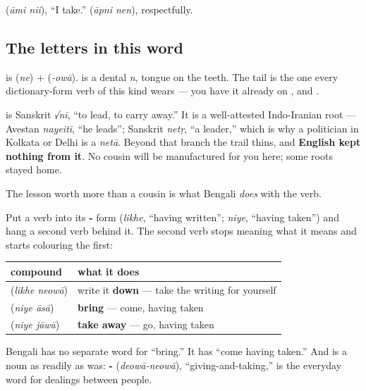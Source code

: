   (\emph{āmi nii}), \textquotedblleft{}I take.\textquotedblright{}   (\emph{āpni nen}), respectfully.

\subsection*{The letters in this word}
\textbf{} is \textbf{} (\emph{ne}) + \textbf{} (\emph{-owā}). \textbf{} is a dental \emph{n}, tongue on the teeth. The \textbf{} tail is the one every dictionary-form verb of this kind wears — you have it already on ,  and .

\begin{cousinweb}
\textbf{} is Sanskrit \emph{√nī}, \textquotedblleft{}to lead, to carry away.\textquotedblright{} It is a well-attested Indo-Iranian root — Avestan \emph{nayeiti}, \textquotedblleft{}he leads\textquotedblright{}; Sanskrit \emph{netṛ}, \textquotedblleft{}a leader,\textquotedblright{} which is why a politician in Kolkata or Delhi is a \emph{netā}. Beyond that branch the trail thins, and \textbf{English kept nothing from it}. No cousin will be manufactured for you here; some roots stayed home.

The lesson worth more than a cousin is what Bengali \emph{does} with the verb.
\end{cousinweb}

\begin{grammarlens}[title={Grammar Lens: the verb that ends a compound}]
Put a verb into its \textbf{-} form (\emph{likhe}, \textquotedblleft{}having written\textquotedblright{}; \emph{niye}, \textquotedblleft{}having taken\textquotedblright{}) and hang a second verb behind it. The second verb stops meaning what it means and starts colouring the first:

\noindent
\begin{tabularx}{\linewidth}{@{}>{\raggedright\arraybackslash}X>{\raggedright\arraybackslash}X@{}}
\toprule
\textbf{compound} & \textbf{what it does} \\
\midrule
\bn{লিখে} \bn{নেওয়া} (\emph{likhe neowā}) & write it \textbf{down} — take the writing for yourself \\
\bn{নিয়ে} \bn{আসা} (\emph{niye āsā}) & \textbf{bring} — come, having taken \\
\bn{নিয়ে} \bn{যাওয়া} (\emph{niye jāwā}) & \textbf{take away} — go, having taken \\
\bottomrule
\end{tabularx}

Bengali has no separate word for \textquotedblleft{}bring.\textquotedblright{} It has \textquotedblleft{}come having taken.\textquotedblright{} And  is a noun as readily as  was: \textbf{-} (\emph{deowā-neowā}), \textquotedblleft{}giving-and-taking,\textquotedblright{} is the everyday word for dealings between people.
\end{grammarlens}

